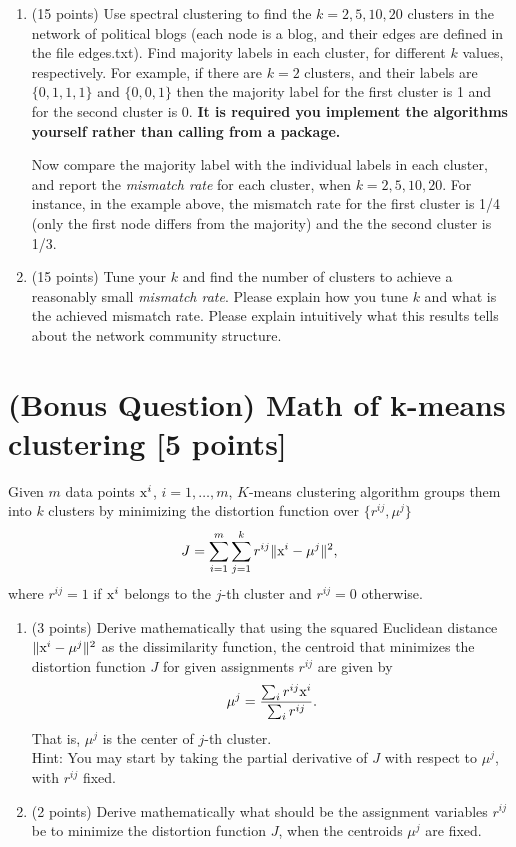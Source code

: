 \documentclass[twoside,10pt]{article}
\begin{document}
\begin{enumerate}

\item (15 points) Use spectral clustering to find the $k = 2, 5, 10, 20$ clusters in the network of political blogs (each node is a blog, and their edges are defined in the file \textsf{edges.txt}). Find majority labels in each cluster, for different $k$ values, respectively. For example, if there are $k = 2$ clusters, and their labels are $\{0, 1, 1, 1\}$ and $\{0, 0, 1\}$ then the majority label for the first cluster is 1 and for the second cluster is 0. {\bf It is required you implement the algorithms yourself rather than calling from a package.} 

Now compare the majority label with the individual labels in each cluster, and report the {\it mismatch rate} for each cluster, when $k = 2, 5, 10, 20$. For instance, in the example above, the mismatch rate for the first cluster is 1/4 (only the first node differs from the majority) and the the second cluster is 1/3. 

\item (15  points) Tune your $k$ and find the number of clusters to achieve a reasonably small {\it mismatch rate}. Please explain how you tune $k$ and what is the achieved mismatch rate. Please explain intuitively what this results tells about the network community structure.

\end{enumerate}

\section{(Bonus Question) Math of k-means clustering [5 points]}

Given $m$ data points $\text x^i$, $i=1,\dots, m$, $K$-means clustering algorithm groups them into $k$ clusters by minimizing the distortion function over $\{ r^{ij}, \mu^j \}$
\begin{equation}
J =\sum_{i=1}^m\sum_{j=1}^k r^{ij} \|\text x^i-\mu^j\|^2,
\label{J_def}
\end{equation}
where $r^{ij}=1$ if $\text x^i$ belongs to the $j$-th cluster and $r^{ij}=0$ otherwise.

\begin{enumerate}

\item (3 points) Derive mathematically that using the squared Euclidean distance $\|\text x^i-\mu^j\|^2$ as the dissimilarity function, the centroid that minimizes the distortion function $J$  for given assignments $r^{ij}$ are given by
   $$\mu^j=\frac{\sum_i r^{ij} \text x^i}{\sum_i r^{ij}}.$$
   That is, $\mu^j$ is the center of $j$-th cluster.  \\
   Hint: You may start by taking the partial derivative of $J$ with respect to $\mu^j$, with $r^{ij}$ fixed.
   
   
\item (2 points) Derive mathematically what should be the assignment variables $r^{ij}$ be to minimize the distortion function $J$, when the centroids $\mu^j$ are fixed.

\end{enumerate}
\end{document}
